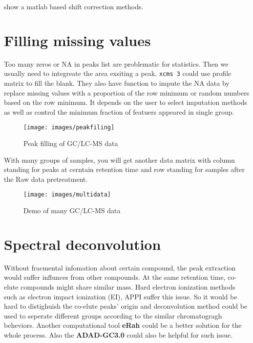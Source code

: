 \documentclass[
]{book}
\begin{document}
\citep{fu2017} show a matlab based shift correction methods.

\hypertarget{filling-missing-values}{%
\section{Filling missing values}\label{filling-missing-values}}

Too many zeros or NA in peaks list are problematic for statistics. Then we usually need to integreate the area exsiting a peak. \texttt{xcms\ 3} could use profile matrix to fill the blank. They also have function to impute the NA data by replace missing values with a proportion of the row minimum or random numbers based on the row minimum. It depends on the user to select imputation methods as well as control the minimum fraction of featuers appeared in single group.

\begin{figure}
\texttt{[image: images/peakfiling]} \caption{Peak filling of GC/LC-MS data}\label{fig:peakfilling}
\end{figure}

With many groups of samples, you will get another data matrix with column standing for peaks at cerntain retention time and row standing for samples after the Raw data pretreatment.

\begin{figure}
\texttt{[image: images/multidata]} \caption{Demo of many GC/LC-MS data}\label{fig:multidata}
\end{figure}

\hypertarget{spectral-deconvolution}{%
\section{Spectral deconvolution}\label{spectral-deconvolution}}

Without fracmental infomation about certain compound, the peak extraction would suffer influnces from other compounds. At the same retention time, co-elute compounds might share similar mass. Hard electron ionization methods such as electron impact ionization (EI), APPI suffer this issue. So it would be hard to distighuish the co-elute peaks' origin and deconvolution method\citep{du2013} could be used to seperate different groups according to the similar chromatogragh beheviors. Another computational tool \textbf{eRah} could be a better solution for the whole process\citep{domingo-almenara2016}. Also the \textbf{ADAD-GC3.0} could also be helpful for such issue\citep{ni2016}.
\end{document}
